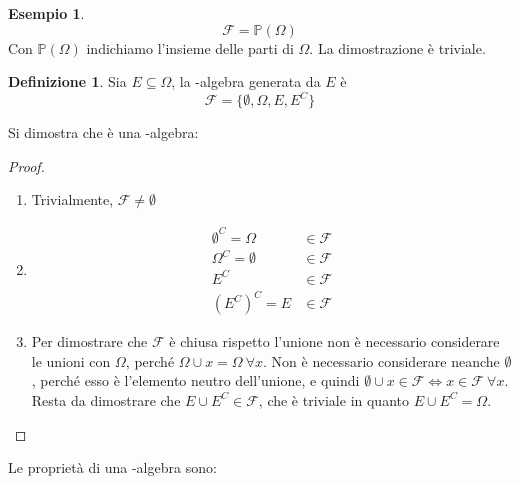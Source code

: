 \documentclass{article}
\theoremstyle{plain}
\theoremstyle{definition}
\newtheorem{definizione}{Definizione}[section]
\newtheorem{esempio}{Esempio}[section]
\theoremstyle{remark}
\begin{document}
\begin{esempio}
	\begin{equation*}
		\mathscr{F}=\mathds{P}(\Omega)
	\end{equation*}
	Con $\mathds{P}(\Omega)$ indichiamo l'insieme delle parti di $\Omega$. La dimostrazione è triviale.
\end{esempio}
\begin{definizione}
	Sia $E\subseteq\Omega$, la \sigma-algebra generata da $E$ è
	\begin{equation*}
		\mathscr{F}=\{\emptyset,\Omega,E,E^C\}
	\end{equation*}
\end{definizione}
Si dimostra che è una \sigma-algebra:
\begin{proof}
	\begin{enumerate}
		\item Trivialmente, $\mathscr{F}\neq\emptyset$
		\item 
		\begin{align*}
			\emptyset^C=\Omega&\in\mathscr{F}\\
			\Omega^C=\emptyset&\in\mathscr{F}\\
			E^C&\in\mathscr{F}\\
			(E^C)^C=E&\in\mathscr{F}
		\end{align*}
		\item Per dimostrare che $\mathscr{F}$ è chiusa rispetto l'unione non è necessario considerare le unioni con $\Omega$, perché $\Omega\cup x=\Omega\ \forall x$. Non è necessario considerare neanche $\emptyset$, perché esso è l'elemento neutro dell'unione, e quindi $\emptyset\cup x\in\mathscr{F}\Leftrightarrow x\in\mathscr{F}\ \forall x$. Resta da dimostrare che $E\cup E^C\in\mathscr{F}$, che è triviale in quanto $E\cup E^C=\Omega$.
	\end{enumerate}
\end{proof}
Le proprietà di una \sigma-algebra sono:
\end{document}
